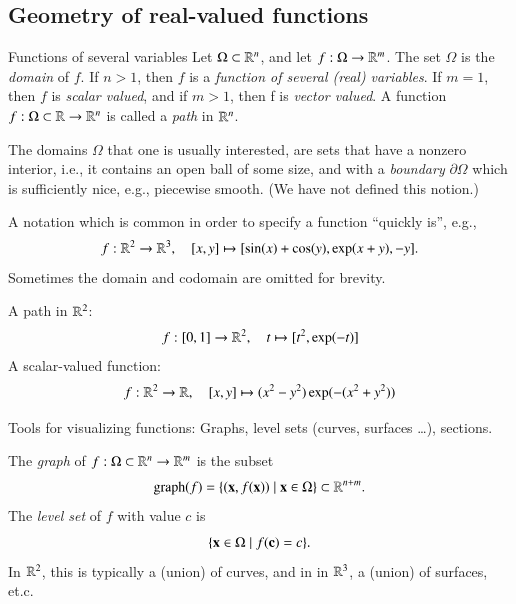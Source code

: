 

\subsection{Geometry of real-valued functions}

\begin{myDefinition}{Functions of several variables}{}
    Let $\Omega \subset \mathbb{R}^n$, and let $f : \Omega \to \mathbb{R}^m$. The set $\Omega$ is the \emph{domain} of $f$. If $n > 1$, then $f$ is a \emph{function of several (real) variables}. If $m = 1$, then $f$ is \emph{scalar valued}, and if $m > 1$, then f is \emph{vector valued}. A function $f : \Omega \subset \mathbb{R} \to \mathbb{R}^n$ is called a \emph{path} in $\mathbb{R}^n$.
\end{myDefinition}

The domains $\Omega$ that one is usually interested, are sets that have a nonzero interior, i.e., it contains an open ball of some size, and with a \emph{boundary} $\partial\Omega$ which is sufficiently nice, e.g., piecewise smooth. (We have not defined this notion.)

A notation which is common in order to specify a function ``quickly is'', e.g.,
\begin{equation}
    f : \mathbb{R}^2 \to \mathbb{R}^3, \quad [x,y] \mapsto [\sin(x) + \cos(y), \exp(x + y), -y].
\end{equation}
Sometimes the domain and codomain are omitted for brevity.

\begin{myExample}{}{}
A path in $\mathbb{R}^2$:
\begin{equation}
    f : [0,1] \to \mathbb{R}^2, \quad t \mapsto [t^2, \exp(-t)]
\end{equation}
 A scalar-valued function:
 \begin{equation}
     f : \mathbb{R}^2 \to \mathbb{R}, \quad [x,y] \mapsto (x^2 - y^2)\exp(-(x^2+y^2))
 \end{equation}
 
\end{myExample}


Tools for visualizing functions: Graphs, level sets (curves, surfaces \ldots), sections.

The \emph{graph} of $f : \Omega \subset \mathbb{R}^n\to\mathbb{R}^m$ is the subset
\begin{equation}
    \operatorname{graph}(f) = \{ (\mathbf{x},f(\mathbf{x})) \mid \mathbf{x}\in\Omega \} \subset \mathbb{R}^{n + m}.
\end{equation}
The \emph{level set} of $f$ with value $c$ is
\begin{equation}
    \{ \mathbf{x} \in \Omega \mid f(\mathbf{c}) = c \}.
\end{equation}
In $\mathbb{R}^2$, this is typically a (union) of curves, and in in $\mathbb{R}^3$, a (union) of surfaces, et.c.

